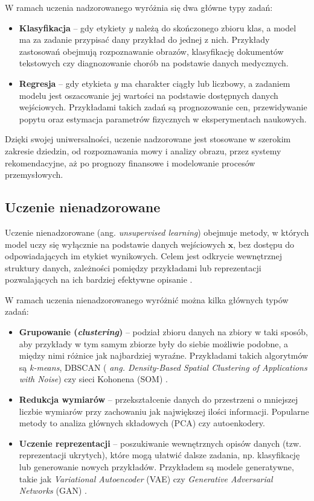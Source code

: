 W ramach uczenia nadzorowanego wyróżnia się dwa główne typy zadań:
\begin{itemize}
	\item \textbf{Klasyfikacja} – gdy etykiety $y$ należą do skończonego zbioru klas, a model ma za zadanie przypisać dany przykład do jednej z nich. Przykłady zastosowań obejmują rozpoznawanie obrazów, klasyfikację dokumentów tekstowych czy diagnozowanie chorób na podstawie danych medycznych.
	\item \textbf{Regresja} –  gdy etykieta $y$ ma charakter ciągły lub liczbowy, a zadaniem modelu jest oszacowanie jej wartości na podstawie dostępnych danych wejściowych. Przykładami takich zadań są prognozowanie cen, przewidywanie popytu oraz estymacja parametrów fizycznych w eksperymentach naukowych.
\end{itemize}

Dzięki swojej uniwersalności, uczenie nadzorowane jest stosowane w szerokim zakresie dziedzin, od rozpoznawania mowy i analizy obrazu, przez systemy rekomendacyjne, aż po prognozy finansowe i modelowanie procesów przemysłowych.

\subsection*{Uczenie nienadzorowane}

Uczenie nienadzorowane (ang. \textit{unsupervised learning}) obejmuje metody, w których model uczy się wyłącznie na podstawie danych wejściowych $\mathbf{x}$, bez dostępu do odpowiadających im etykiet wynikowych. Celem jest odkrycie wewnętrznej struktury danych, zależności pomiędzy przykładami lub reprezentacji pozwalających na ich bardziej efektywne opisanie \cite{Goodfellow-et-al-2016}.  

W ramach uczenia nienadzorowanego wyróżnić można kilka głównych typów zadań:
\begin{itemize}
	\item \textbf{Grupowanie (\textit{clustering})} – podział zbioru danych na zbiory w taki sposób, aby przykłady w tym samym zbiorze były do siebie możliwie podobne, a między nimi różnice jak najbardziej wyraźne. Przykładami takich algorytmów są \textit{k-means}, DBSCAN (\textit{ ang. Density-Based Spatial Clustering of Applications with Noise}) czy sieci Kohonena (SOM) \cite{Kohonen1990}.
	\item \textbf{Redukcja wymiarów} – przekształcenie danych do przestrzeni o mniejszej liczbie wymiarów przy zachowaniu jak największej ilości informacji. Popularne metody to analiza głównych składowych (PCA) czy autoenkodery.
	\item \textbf{Uczenie reprezentacji} – poszukiwanie wewnętrznych opisów danych (tzw. reprezentacji ukrytych), które mogą ułatwić dalsze zadania, np. klasyfikację lub generowanie nowych przykładów. Przykładem są modele generatywne, takie jak \textit{Variational Autoencoder} (VAE) czy \textit{Generative Adversarial Networks} (GAN) \cite{GoodfellowGAN2014}.
\end{itemize}

